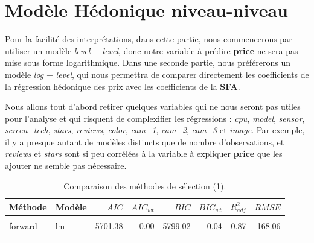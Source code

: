 \documentclass[
  12pt,
]{report}
\begin{document}
\newpage

\section{Modèle Hédonique
niveau-niveau}\label{moduxe8le-huxe9donique-niveau-niveau}

Pour la facilité des interprétations, dans cette partie, nous
commencerons par utiliser un modèle \emph{level} \(-\) \emph{level},
donc notre variable à prédire \textbf{price} ne sera pas mise sous forme
logarithmique. Dans une seconde partie, nous préférerons un modèle
\emph{log} \(-\) \emph{level}, qui nous permettra de comparer
directement les coefficients de la régression hédonique des prix avec
les coefficients de la \textbf{SFA}.

Nous allons tout d'abord retirer quelques variables qui ne nous seront
pas utiles pour l'analyse et qui risquent de complexifier les
régressions : \emph{cpu}, \emph{model}, \emph{sensor},
\emph{screen\_tech}, \emph{stars}, \emph{reviews}, \emph{color},
\emph{cam\_1}, \emph{cam\_2}, \emph{cam\_3} et \emph{image}. Par
exemple, il y a presque autant de modèles distincts que de nombre
d'observations, et \emph{reviews} et \emph{stars} sont si peu corrélées
à la variable à expliquer \textbf{price} que les ajouter ne semble pas
nécessaire.

\begin{table}[!h]
\centering
\caption{\label{tab:kable_perf}Comparaison des méthodes de sélection (1).}
\centering
\begin{tabular}[t]{llrrrrrr}
\toprule
\textbf{Méthode} & \textbf{Modèle} & \textbf{$AIC$} & \textbf{$AIC_{wt}$} & \textbf{$BIC$} & \textbf{$BIC_{wt}$} & \textbf{$R^2_{adj}$} & \textbf{$RMSE$}\\
\midrule
\cellcolor{gray!10}{backward} & \cellcolor{gray!10}{lm} & \cellcolor{gray!10}{5690.77} & \cellcolor{gray!10}{0.89} & \cellcolor{gray!10}{5800.62} & \cellcolor{gray!10}{0.02} & \cellcolor{gray!10}{0.88} & \cellcolor{gray!10}{164.86}\\
forward & lm & 5701.38 & 0.00 & 5799.02 & 0.04 & 0.87 & 168.06\\
\cellcolor{gray!10}{genetic} & \cellcolor{gray!10}{lm} & \cellcolor{gray!10}{5694.93} & \cellcolor{gray!10}{0.11} & \cellcolor{gray!10}{5792.57} & \cellcolor{gray!10}{0.95} & \cellcolor{gray!10}{0.87} & \cellcolor{gray!10}{166.81}\\
\bottomrule
\end{tabular}
\end{table}
\end{document}
